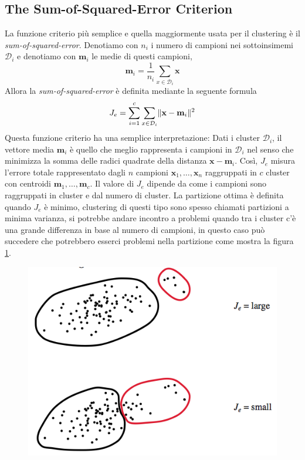 \subsection{The Sum-of-Squared-Error Criterion}
La funzione criterio più semplice e quella maggiormente usata per il clustering è il \emph{sum-of-squared-error}. Denotiamo con $n_i$ i numero di campioni nei sottoinsimemi $\mathcal{D}_i$ e denotiamo con $\mathbf{m}_i$ le medie di questi campioni, 
\begin{equation}
\mathbf{m}_i = \frac{1}{n_i} \sum_{x \in \mathcal{D}_i} \mathbf{x}
\end{equation}
Allora la \emph{sum-of-squared-error} è definita mediante la seguente formula
\begin{equation}
J_e = \sum_{i=1}^c \sum_{x \in \mathcal{D}_i} \lVert\mathbf{x} - \mathbf{m}_i\rVert^2
\end{equation}
Questa funzione criterio ha una semplice interpretazione: Dati i cluster $\mathcal{D}_i$, il vettore media $\mathbf{m}_i$ è quello che meglio rappresenta i campioni in $\mathcal{D}_i$ nel senso che minimizza la somma delle radici quadrate della distanza $\mathbf{x}-\mathbf{m}_i$. Così, $J_e$ misura l'errore totale rappresentato dagli $n$ campioni $\mathbf{x}_1, \dots, \mathbf{x}_n$ raggruppati in $c$ cluster con centroidi $\mathbf{m}_1, \dots, \mathbf{m}_c$. Il valore di $J_e$ dipende da come i campioni sono raggruppati in cluster e dal numero di cluster. La partizione ottima è definita quando $J_e$ è minimo, clustering di questi tipo sono spesso chiamati partizioni a minima varianza, si potrebbe andare incontro a problemi quando tra i cluster c'è una grande differenza in base al numero di campioni, in questo caso può succedere che potrebbero esserci problemi nella partizione come  mostra la figura \ref{cluster}.
\begin{figure}
\centering
\includegraphics[scale=0.5]{img/cluster.png}
\caption{}
\label{cluster}
\end{figure}
 
